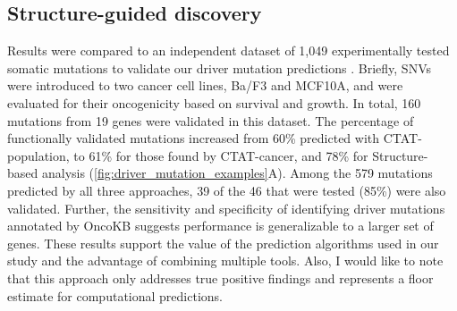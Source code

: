 \subsection{Structure-guided discovery}
Results were compared to an independent dataset of 1,049 experimentally tested somatic mutations to validate our driver mutation predictions \cite{RN187}. Briefly, SNVs were introduced to two cancer cell lines, Ba/F3 and MCF10A, and were evaluated for their oncogenicity based on survival and growth. In total, 160 mutations from 19 genes were validated in this dataset. The percentage of functionally validated mutations increased from 60\% predicted with CTAT-population, to 61\% for those found by CTAT-cancer, and 78\% for Structure-based analysis (\autoref{fig:driver_mutation_examples}A). Among the 579 mutations predicted by all three approaches, 39 of the 46 that were tested (85\%) were also validated. Further, the sensitivity and specificity of identifying driver mutations annotated by OncoKB suggests performance is generalizable to a larger set of genes. These results support the value of the prediction algorithms used in our study and the advantage of combining multiple tools. Also, I would like to note that this approach only addresses true positive findings and represents a floor estimate for computational predictions.

